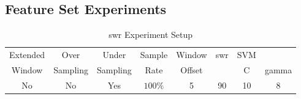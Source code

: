 
\subsection{Feature Set Experiments}


\begin{table}[h]
\begin{center}

    \begin{tabular}{|c|c|c|c|c|c|cc|}
        \hline
        Extended & Over & Under & Sample & Window & \gls{swr} & SVM & \\
        Window & Sampling & Sampling & Rate & Offset &  & C & gamma \\ \hline
        No & No & Yes & $100\%$ & 5 & 90 & 10 & 8 \\ \hline
    \end{tabular}
    \caption{\gls{swr} Experiment Setup}
    \label{tab:svm_feature_experiment_setup}
\end{center}

\end{table}



